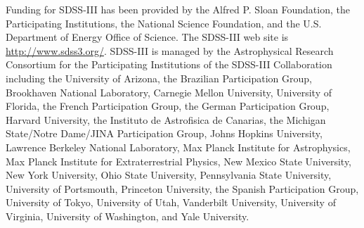 \documentclass[a4paper,fleqn,usenatbib]{mnras}
\begin{document}
Funding for SDSS-III has been provided by the Alfred P. Sloan
Foundation, the Participating Institutions, the National Science
Foundation, and the U.S. Department of Energy Office of Science. The
SDSS-III web site is
\href{http://www.sdss3.org/}{http://www.sdss3.org/}.
SDSS-III is managed by the Astrophysical Research Consortium for the
Participating Institutions of the SDSS-III Collaboration including the
University of Arizona, the Brazilian Participation Group, Brookhaven
National Laboratory, Carnegie Mellon University, University of
Florida, the French Participation Group, the German Participation
Group, Harvard University, the Instituto de Astrofisica de Canarias,
the Michigan State/Notre Dame/JINA Participation Group, Johns Hopkins
University, Lawrence Berkeley National Laboratory, Max Planck
Institute for Astrophysics, Max Planck Institute for Extraterrestrial
Physics, New Mexico State University, New York University, Ohio State
University, Pennsylvania State University, University of Portsmouth,
Princeton University, the Spanish Participation Group, University of
Tokyo, University of Utah, Vanderbilt University, University of
Virginia, University of Washington, and Yale University.




\bsp	%
\label{lastpage}
\end{document}
